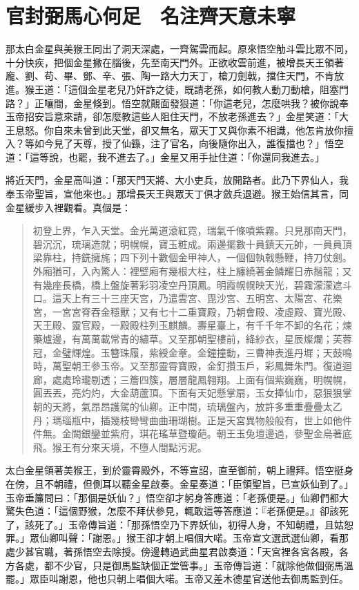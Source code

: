 
\chapter{官封弼馬心何足　名注齊天意未寧}

那太白金星與美猴王同出了洞天深處，一齊駕雲而起。原來悟空觔斗雲比眾不同，十分快疾，把個金星撇在腦後，先至南天門外。正欲收雲前進，被增長天王領著龐、劉、苟、畢、鄧、辛、張、陶一路大力天丁，槍刀劍戟，擋住天門，不肯放進。猴王道：「這個金星老兒乃奸詐之徒，既請老孫，如何教人動刀動槍，阻塞門路？」正嚷間，金星倏到。悟空就覿面發狠道：「你這老兒，怎麼哄我？被你說奉玉帝招安旨意來請，卻怎麼教這些人阻住天門，不放老孫進去？」金星笑道：「大王息怒。你自來未曾到此天堂，卻又無名，眾天丁又與你素不相識，他怎肯放你擅入？等如今見了天尊，授了仙籙，注了官名，向後隨你出入，誰復擋也？」悟空道：「這等說，也罷，我不進去了。」金星又用手扯住道：「你還同我進去。」

將近天門，金星高叫道：「那天門天將、大小吏兵，放開路者。此乃下界仙人，我奉玉帝聖旨，宣他來也。」那增長天王與眾天丁俱才斂兵退避。猴王始信其言，同金星緩步入裡觀看。真個是：
\begin{quote}
初登上界，乍入天堂。金光萬道滾紅霓，瑞氣千條噴紫霧。只見那南天門，碧沉沉，琉璃造就；明幌幌，寶玉粧成。兩邊擺數十員鎮天元帥，一員員頂梁靠柱，持銑擁旄；四下列十數個金甲神人，一個個執戟懸鞭，持刀仗劍。外廂猶可，入內驚人：裡壁廂有幾根大柱，柱上纏繞著金鱗耀日赤鬚龍；又有幾座長橋，橋上盤旋著彩羽凌空丹頂鳳。明霞幌幌映天光，碧霧濛濛遮斗口。這天上有三十三座天宮，乃遣雲宮、毘沙宮、五明宮、太陽宮、花樂宮，一宮宮脊吞金穩獸；又有七十二重寶殿，乃朝會殿、凌虛殿、寶光殿、天王殿、靈官殿，一殿殿柱列玉麒麟。壽星臺上，有千千年不卸的名花；煉藥爐邊，有萬萬載常青的繡草。又至那朝聖樓前，絳紗衣，星辰燦爛；芙蓉冠，金璧輝煌。玉簪珠履，紫綬金章。金鐘撞動，三曹神表進丹墀；天鼓鳴時，萬聖朝王參玉帝。又至那靈霄寶殿，金釘攢玉戶，彩鳳舞朱門。復道迴廊，處處玲瓏剔透；三簷四簇，層層龍鳳翱翔。上面有個紫巍巍，明幌幌，圓丟丟，亮灼灼，大金葫蘆頂。下面有天妃懸掌扇，玉女捧仙巾，惡狠狠掌朝的天將，氣昂昂護駕的仙卿。正中間，琉璃盤內，放許多重重疊疊太乙丹；瑪瑙瓶中，插幾枝彎彎曲曲珊瑚樹。正是天宮異物般般有，世上如他件件無。金闕銀鑾並紫府，琪花瑤草暨瓊葩。朝王玉兔壇邊過，參聖金烏著底飛。猴王有分來天境，不墮人間點污泥。
\end{quote}

太白金星領著美猴王，到於靈霄殿外，不等宣詔，直至御前，朝上禮拜。悟空挺身在傍，且不朝禮，但側耳以聽金星啟奏。金星奏道：「臣領聖旨，已宣妖仙到了。」玉帝垂簾問曰：「那個是妖仙？」悟空卻才躬身答應道：「老孫便是。」仙卿們都大驚失色道：「這個野猴，怎麼不拜伏參見，輒敢這等答應道：『老孫便是。』卻該死了，該死了。」玉帝傳旨道：「那孫悟空乃下界妖仙，初得人身，不知朝禮，且姑恕罪。」眾仙卿叫聲：「謝恩。」猴王卻才朝上唱個大喏。玉帝宣文選武選仙卿，看那處少甚官職，著孫悟空去除授。傍邊轉過武曲星君啟奏道：「天宮裡各宮各殿，各方各處，都不少官，只是御馬監缺個正堂管事。」玉帝傳旨道：「就除他做個弼馬溫罷。」眾臣叫謝恩，他也只朝上唱個大喏。玉帝又差木德星官送他去御馬監到任。

